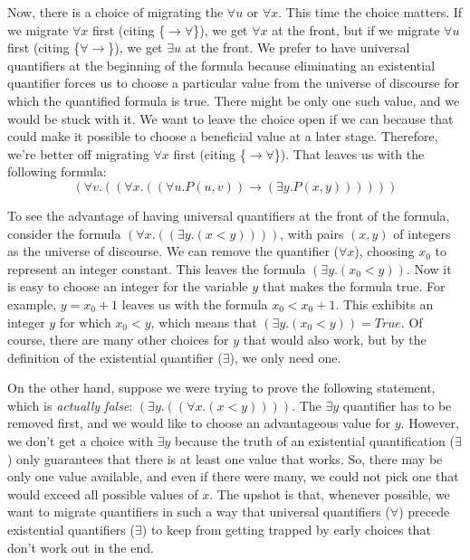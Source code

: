 {{Now, there is a choice of migrating the $\forall u$ or $\forall x$.
This time the choice matters.
If we migrate $\forall x$ first (citing \{${\rightarrow}{\forall}$\}),
we get $\forall x$ at the front,
but if we migrate $\forall u$ first (citing \{${\forall}{\rightarrow}$\}),
we get $\exists u$ at the front.
We prefer to have universal quantifiers at the beginning of the formula
because eliminating an existential quantifier forces us to choose
a particular value from the universe of discourse for which the quantified
formula is true.
There might be only one such value, and we would be stuck with it.
We want to leave the choice open if we can
because that could make it possible to choose a beneficial value at
a later stage.
Therefore, we're better off migrating $\forall x$ first
(citing \{${\rightarrow}{\forall}$\}).
That leaves us with the following formula:
$$(\forall v.((\forall x.((\forall u.P(u, v)) \rightarrow (\exists y.P(x, y))))))$$

To see the advantage of having universal quantifiers at the front of the formula,
consider the formula $(\forall x.((\exists y.(x < y))))$,
with pairs $(x,y)$ of integers as the universe of discourse.
We can remove the quantifier ($\forall x$), choosing $x_0$ to
represent an integer constant.
This leaves the formula $(\exists y.(x_0 < y))$.
Now it is easy to choose an integer for the variable $y$
that makes the formula true. For example,  $y = x_0+1$
leaves us with the formula $x_0 < x_0 + 1$.
This exhibits an integer $y$ for which $x_0 < y$,
which means that $(\exists y.(x_0 < y)) = True$.
Of course, there are many other choices for $y$ that would also work,
but by the definition of the existential quantifier ($\exists$), we only need one.

On the other hand, suppose we were trying to prove the following statement, which
is \emph{actually false}:
$(\exists y.((\forall x.(x < y))))$.
The $\exists y$ quantifier has to be removed first,
and we would like to choose an advantageous value for $y$.
However, we don't get a choice with $\exists y$ because
the truth of an existential quantification ($\exists$) only guarantees that
there is at least one value that works.
So, there may be only one value available, and even if there were many,
we could not pick one that would exceed all possible values of $x$.
The upshot is that, whenever possible, we want to migrate quantifiers
in such a way that universal quantifiers ($\forall$)
precede existential quantifiers ($\exists$)
to keep from getting trapped by early choices that don't work out in the end.

}}
